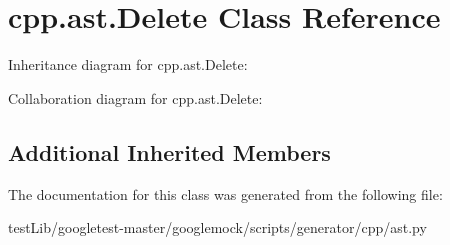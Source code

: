 \hypertarget{classcpp_1_1ast_1_1Delete}{}\section{cpp.\+ast.\+Delete Class Reference}
\label{classcpp_1_1ast_1_1Delete}


Inheritance diagram for cpp.\+ast.\+Delete\+:


Collaboration diagram for cpp.\+ast.\+Delete\+:
\subsection*{Additional Inherited Members}


The documentation for this class was generated from the following file\+:\begin{DoxyCompactItemize}
\item 
test\+Lib/googletest-\/master/googlemock/scripts/generator/cpp/ast.\+py\end{DoxyCompactItemize}
